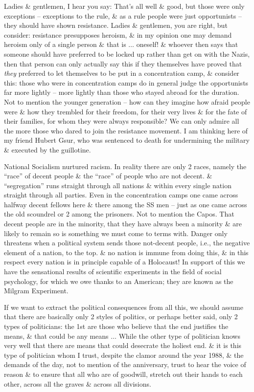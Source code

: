 \documentclass{article}
\numberwithin{equation}{section}
\begin{document}
Ladies \& gentlemen, I hear you say: That's all well \& good, but those were only exceptions -- exceptions to the rule, \& as a rule people were just opportunists -- they should have shown resistance. Ladies \& gentlemen, you are right, but consider: resistance presupposes heroism, \& in my opinion one may demand heroism only of a single person \& that is $\ldots$ oneself! \& whoever then says that someone should have preferred to be locked up rather than get on with the Nazis, then that person can only actually say this if they themselves have proved that \textit{they} preferred to let themselves to be put in a concentration camp, \& consider this: those who were in concentration camps do in general judge the opportunists far more lightly -- more lightly than those who stayed abroad for the duration. Not to mention the younger generation -- how can they imagine how afraid people were \& how they trembled for their freedom, for their very lives \& for the fate of their families, for whom they were always responsible? We can only admire all the more those who dared to join the resistance movement. I am thinking here of my friend Hubert Gsur, who was sentenced to death for undermining the military \& executed by the guillotine.

National Socialism nurtured racism. In reality there are only 2 races, namely the ``race'' of decent people \& the ``race'' of people who are not decent. \& ``segregation'' runs straight through all nations \& within every single nation straight through all parties. Even in the concentration camps one came across halfway decent fellows here \& there among the SS men -- just as one came across the old scoundrel or 2 among the prisoners. Not to mention the Capos. That decent people are in the minority, that they have always been a minority \& are likely to remain so is something we must come to terms with. Danger only threatens when a political system sends those not-decent people, i.e., the negative element of a nation, to the top. \& no nation is immune from doing this, \& in this respect every nation is in principle capable of a Holocaust! In support of this we have the sensational results of scientific experiments in the field of social psychology, for which we owe thanks to an American; they are known as the Milgram Experiment.

If we want to extract the political consequences from all this, we should assume that there are basically only 2 styles of politics, or perhaps better said, only 2 types of politicians: the 1st are those who believe that the end justifies the means, \& that could be any means $\ldots$ While the other type of politician knows very well that there are means that could desecrate the holiest end. \& it is this type of politician whom I trust, despite the clamor around the year 1988, \& the demands of the day, not to mention of the anniversary, trust to hear the voice of reason \& to ensure that all who are of goodwill, stretch out their hands to each other, across all the graves \& across all divisions.
\end{document}
